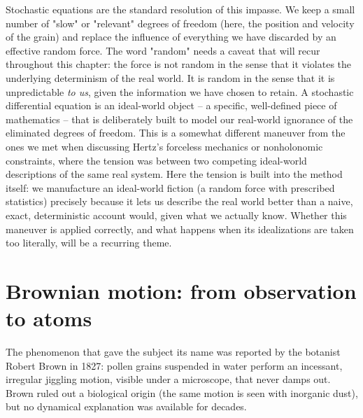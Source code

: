 Stochastic equations are the standard resolution of this impasse. We keep a
small number of "slow" or "relevant" degrees of freedom (here, the position
and velocity of the grain) and replace the influence of everything we have
discarded by an effective random force. The word "random" needs a caveat
that will recur throughout this chapter: the force is not random in the
sense that it violates the underlying determinism of the real world. It is
random in the sense that it is unpredictable \emph{to us}, given the
information we have chosen to retain. A stochastic differential equation is
an ideal-world object -- a specific, well-defined piece of mathematics --
that is deliberately built to model our real-world ignorance of the
eliminated degrees of freedom. This is a somewhat different maneuver from
the ones we met when discussing Hertz's forceless mechanics or nonholonomic
constraints, where the tension was between two competing ideal-world
descriptions of the same real system. Here the tension is built into the
method itself: we manufacture an ideal-world fiction (a random force with
prescribed statistics) precisely because it lets us describe the real world
better than a naive, exact, deterministic account would, given what we
actually know. Whether this maneuver is applied correctly, and what happens
when its idealizations are taken too literally, will be a recurring theme.

\section{Brownian motion: from observation to atoms}
\label{sec:brownian}

The phenomenon that gave the subject its name was reported by the botanist
Robert Brown in 1827: pollen grains suspended in water perform an
incessant, irregular jiggling motion, visible under a microscope, that
never damps out. Brown ruled out a biological origin (the same motion is
seen with inorganic dust), but no dynamical explanation was available for
decades.

